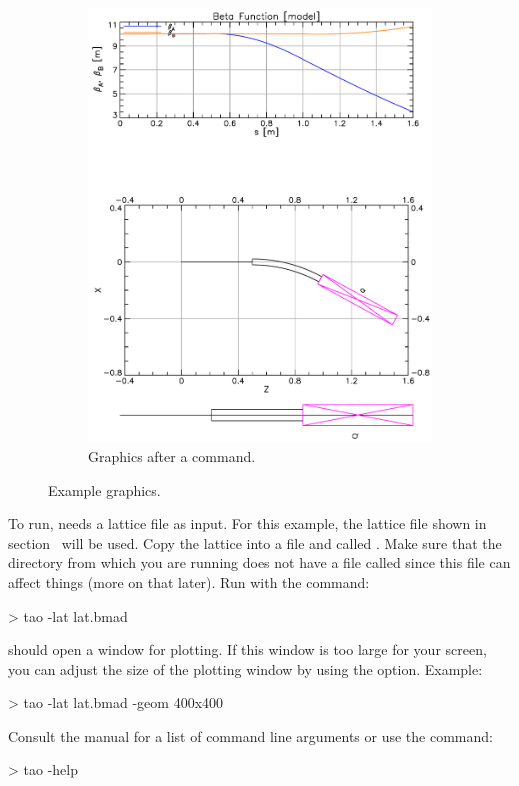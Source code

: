 \documentclass{hitec}
\begin{document}
\begin{figure}[tb]
\begin{subfigure}[b]{0.45\textwidth}
    \includegraphics[width=\textwidth]{lat-floor.pdf}
    \caption{Graphics after a  command.}
    \label{f:lat.floor}
  \end{subfigure}
  \caption{Example \tao graphics.}
\end{figure}

To run, \tao needs a lattice file as input. For this example, the lattice file shown in
section~ will be used. Copy the lattice into a file and called .
Make sure that the directory from which you are running \tao does not have a file called
 since this file can affect things (more on that later). Run \tao with the command:
\begin{code}
> tao -lat lat.bmad
\end{code}
\tao should open a window for plotting. If this window is too large for your screen, you can adjust
the size of the plotting window by using the  option. Example:
\begin{code}
> tao -lat lat.bmad -geom 400x400
\end{code}
Consult the \tao manual for a list of command line arguments or use the command:
\begin{code}
> tao -help
\end{code}
\end{document}
